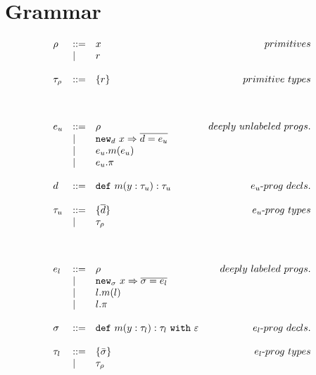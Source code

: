 \documentclass{llncs}
\newcommand{\keywadj}[1]{\mathtt{#1}}
\newcommand{\keyw}[1]{\keywadj{#1}~}
\newcommand{\kw}[1]{\keyw{ #1 }}
\newcommand{\kwa}[1]{\keywadj{ #1 }}
\newcommand{\hyphen}{\hbox{-}}
\begin{document}
\section{Grammar}

\[
\begin{array}{lll}

\begin{array}{lllr}

\rho & ::= & x & primitives\\
		& | & r \\
		&&\\
		
\tau_\rho & ::= & \{ r \} & primitive~types \\
		&&\\\\\\

e_u & ::= & \rho & deeply~unlabeled~progs. \\
 		& | & \kwa{new}_d~x \Rightarrow \overline{d = e_u} \\
 		& | & e_u.m(e_u)\\
 		& | & e_u.\pi\\
		&&\\

d & ::= & \kw{def} m(y:\tau_u):\tau_u & e_u \hyphen prog~decls.\\
		&&\\

\tau_u & ::= & \{ \overline{ d } \} & e_u \hyphen prog~types \\
	& | & \tau_\rho \\
	&&\\\\\\





e_l & ::= & \rho & deeply~labeled~progs. \\
	& | & \kwa{new}_\sigma~x \Rightarrow \overline{\sigma = e_l} \\
	& | & l.m(l) \\
	& | & l.\pi \\
	&&\\

\sigma & ::= & \kwa{def}~m(y : \tau_l) : \tau_l~\kw{with} \varepsilon & e_l \hyphen prog~decls. \\
	&&\\

\tau_l & ::= & \{ \bar \sigma \} & e_l \hyphen prog~types \\
	& | & \tau_\rho \\
	&&\\\\\\
	

\end{array}
\end{array}\]
\end{document}
